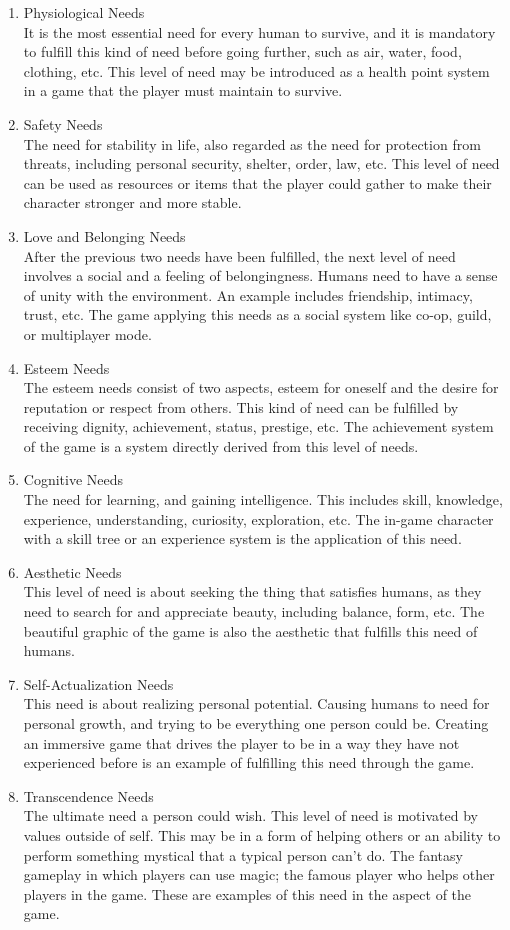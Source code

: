 \documentclass[12pt,oneside,openright,a4paper]{cpe-english-project}
\begin{document}
\begin{enumerate}
	\item Physiological Needs \\
	It is the most essential need for every human to survive, and it is mandatory to fulfill this kind of need before going further, such as air, water, food, clothing, etc. This level of need may be introduced as a health point system in a game that the player must maintain to survive.
	\item Safety Needs \\
	The need for stability in life, also regarded as the need for protection from threats, including personal security, shelter, order, law, etc. This level of need can be used as resources or items that the player could gather to make their character stronger and more stable.
	\item Love and Belonging Needs \\
	After the previous two needs have been fulfilled, the next level of need involves a social and a feeling of belongingness. Humans need to have a sense of unity with the environment. An example includes friendship, intimacy, trust, etc. The game applying this needs as a social system like co-op, guild, or multiplayer mode.
	\item Esteem Needs \\
	The esteem needs consist of two aspects, esteem for oneself and the desire for reputation or respect from others. This kind of need can be fulfilled by receiving dignity, achievement, status, prestige, etc. The achievement system of the game is a system directly derived from this level of needs.
	\item Cognitive Needs \\
	The need for learning, and gaining intelligence. This includes skill, knowledge, experience, understanding, curiosity, exploration, etc. The in-game character with a skill tree or an experience system is the application of this need.
	\item Aesthetic Needs \\
	This level of need is about seeking the thing that satisfies humans, as they need to search for and appreciate beauty, including balance, form, etc. The beautiful graphic of the game is also the aesthetic that fulfills this need of humans.
	\item Self-Actualization Needs \\
	This need is about realizing personal potential. Causing humans to need for personal growth, and trying to be everything one person could be. Creating an immersive game that drives the player to be in a way they have not experienced before is an example of fulfilling this need through the game.
	\item Transcendence Needs \\
	The ultimate need a person could wish. This level of need is motivated by values outside of self. This may be in a form of helping others or an ability to perform something mystical that a typical person can't do. The fantasy gameplay in which players can use magic; the famous player who helps other players in the game. These are examples of this need in the aspect of the game.
\end{enumerate}
\end{document}
